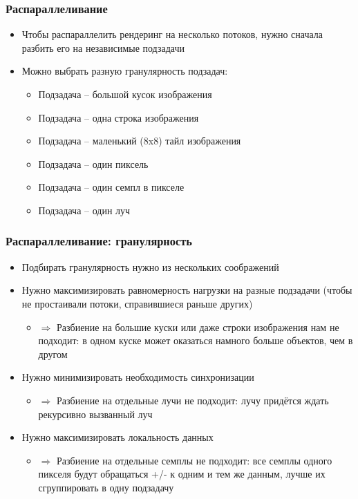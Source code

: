 \documentclass[10pt]{beamer}
\begin{document}
\begin{frame}[fragile]
\frametitle{Распараллеливание}
\begin{itemize}
\item Чтобы распараллелить рендеринг на несколько потоков, нужно сначала разбить его на независимые подзадачи
\pause
\item Можно выбрать разную гранулярность подзадач:
\pause
\begin{itemize}
\item Подзадача -- большой кусок изображения
\pause
\item Подзадача -- одна строка изображения
\pause
\item Подзадача -- маленький (8x8) тайл изображения
\pause
\item Подзадача -- один пиксель
\pause
\item Подзадача -- один семпл в пикселе
\pause
\item Подзадача -- один луч
\end{itemize}
\end{itemize}
\end{frame}

\begin{frame}[fragile]
\frametitle{Распараллеливание: гранулярность}
\begin{itemize}
\item Подбирать гранулярность нужно из нескольких соображений
\pause
\item Нужно максимизировать равномерность нагрузки на разные подзадачи (чтобы не простаивали потоки, справившиеся раньше других)
\pause
\begin{itemize}
\item \begin{math}\Longrightarrow\end{math} Разбиение на большие куски или даже строки изображения нам не подходит: в одном куске может оказаться намного больше объектов, чем в другом
\end{itemize}
\pause
\item Нужно минимизировать необходимость синхронизации
\pause
\begin{itemize}
\item \begin{math}\Longrightarrow\end{math} Разбиение на отдельные лучи не подходит: лучу придётся ждать рекурсивно вызванный луч
\end{itemize}
\pause
\item Нужно максимизировать локальность данных
\pause
\begin{itemize}
\item \begin{math}\Longrightarrow\end{math} Разбиение на отдельные семплы не подходит: все семплы одного пикселя будут обращаться +/- к одним и тем же данным, лучше их сгруппировать в одну подзадачу
\end{itemize}
\end{itemize}
\end{frame}
\end{document}
